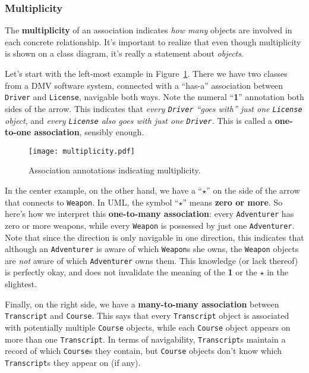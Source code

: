 \subsubsection{Multiplicity}

The \textbf{multiplicity} of an association indicates \textit{how many}
objects are involved in each concrete relationship. It's important to realize
that even though multiplicity is shown on a class diagram, it's really a
statement about \textit{objects}.

Let's start with the left-most example in Figure~\ref{fig:multiplicity}. There
we have two classes from a DMV software system, connected with a ``has-a''
association between \texttt{Driver} and \texttt{License}, navigable both ways.
Note the numeral ``\textbf{1}'' annotation both sides of the arrow. This
indicates that \textit{every \texttt{Driver} ``goes with'' just one
\texttt{License} object}, and \textit{every \texttt{License} also goes with
just one \texttt{Driver}.} This is called a \textbf{one-to-one association},
sensibly enough.

\begin{figure}[ht]
\centering
\texttt{[image: multiplicity.pdf]}   %
\caption{Association annotations indicating multiplicity.}
\label{fig:multiplicity}
\end{figure}

In the center example, on the other hand, we have a ``$\star$'' on the side of
the arrow that connects to \texttt{Weapon}. In UML, the symbol ``$\star$''
means \textbf{zero or more}. So here's how we interpret this
\textbf{one-to-many association}: every \texttt{Adventurer} has zero or more
weapons, while every \texttt{Weapon} is possessed by just one
\texttt{Adventurer}. Note that since the direction is only navigable in one
direction, this indicates that although an \texttt{Adventurer} is aware of
which \texttt{Weapon}s she owns, the \texttt{Weapon} objects are \textit{not}
aware of which \texttt{Adventurer} owns them. This knowledge (or lack thereof)
is perfectly okay, and does not invalidate the meaning of the \textbf{1} or
the $\star$ in the slightest.

Finally, on the right side, we have a \textbf{many-to-many association} between
\texttt{Tran\-script} and \texttt{Course}. This says that every
\texttt{Transcript} object is associated with potentially multiple
\texttt{Course} objects, while each \texttt{Course} object appears on more than
one \texttt{Transcript}. In terms of navigability, \texttt{Transcript}s
maintain a record of which \texttt{Course}s they contain, but
\texttt{Course} objects don't know which \texttt{Transcript}s they appear on
(if any).

